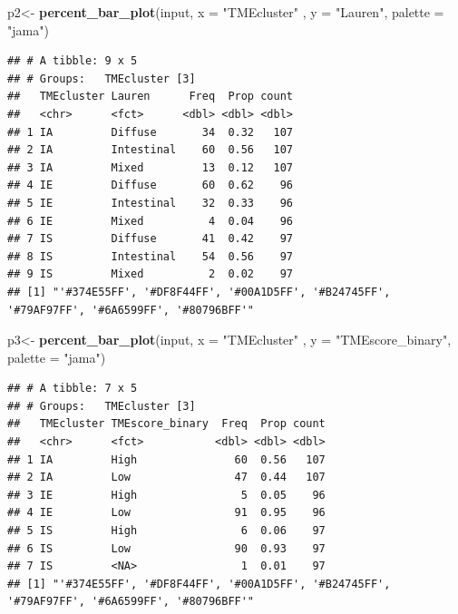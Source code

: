 \documentclass[
  12pt,
]{book}
\newenvironment{Shaded}{\begin{snugshade}}{\end{snugshade}}
\newcommand{\AttributeTok}[1]{\textcolor[rgb]{0.13,0.29,0.53}{#1}}
\newcommand{\FunctionTok}[1]{\textcolor[rgb]{0.13,0.29,0.53}{\textbf{#1}}}
\newcommand{\NormalTok}[1]{#1}
\newcommand{\OtherTok}[1]{\textcolor[rgb]{0.56,0.35,0.01}{#1}}
\newcommand{\StringTok}[1]{\textcolor[rgb]{0.31,0.60,0.02}{#1}}
\begin{document}
\begin{Shaded}
\begin{Highlighting}[]
\NormalTok{p2}\OtherTok{\textless{}{-}} \FunctionTok{percent\_bar\_plot}\NormalTok{(input, }\AttributeTok{x =} \StringTok{"TMEcluster"}\NormalTok{ , }\AttributeTok{y =} \StringTok{"Lauren"}\NormalTok{, }\AttributeTok{palette =} \StringTok{"jama"}\NormalTok{)}
\end{Highlighting}
\end{Shaded}

\begin{verbatim}
## # A tibble: 9 x 5
## # Groups:   TMEcluster [3]
##   TMEcluster Lauren      Freq  Prop count
##   <chr>      <fct>      <dbl> <dbl> <dbl>
## 1 IA         Diffuse       34  0.32   107
## 2 IA         Intestinal    60  0.56   107
## 3 IA         Mixed         13  0.12   107
## 4 IE         Diffuse       60  0.62    96
## 5 IE         Intestinal    32  0.33    96
## 6 IE         Mixed          4  0.04    96
## 7 IS         Diffuse       41  0.42    97
## 8 IS         Intestinal    54  0.56    97
## 9 IS         Mixed          2  0.02    97
## [1] "'#374E55FF', '#DF8F44FF', '#00A1D5FF', '#B24745FF', '#79AF97FF', '#6A6599FF', '#80796BFF'"
\end{verbatim}

\begin{Shaded}
\begin{Highlighting}[]
\NormalTok{p3}\OtherTok{\textless{}{-}} \FunctionTok{percent\_bar\_plot}\NormalTok{(input, }\AttributeTok{x =} \StringTok{"TMEcluster"}\NormalTok{ , }\AttributeTok{y =} \StringTok{"TMEscore\_binary"}\NormalTok{, }\AttributeTok{palette =} \StringTok{"jama"}\NormalTok{)}
\end{Highlighting}
\end{Shaded}

\begin{verbatim}
## # A tibble: 7 x 5
## # Groups:   TMEcluster [3]
##   TMEcluster TMEscore_binary  Freq  Prop count
##   <chr>      <fct>           <dbl> <dbl> <dbl>
## 1 IA         High               60  0.56   107
## 2 IA         Low                47  0.44   107
## 3 IE         High                5  0.05    96
## 4 IE         Low                91  0.95    96
## 5 IS         High                6  0.06    97
## 6 IS         Low                90  0.93    97
## 7 IS         <NA>                1  0.01    97
## [1] "'#374E55FF', '#DF8F44FF', '#00A1D5FF', '#B24745FF', '#79AF97FF', '#6A6599FF', '#80796BFF'"
\end{verbatim}
\end{document}
